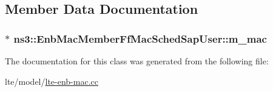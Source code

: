 \subsection{Member Data Documentation}
\subsubsection[{\texorpdfstring{m\+\_\+mac}{m_mac}}]{$\ast$ ns3\+::\+Enb\+Mac\+Member\+Ff\+Mac\+Sched\+Sap\+User\+::m\+\_\+mac\hspace{0.3cm}{\ttfamily [private]}}\hypertarget{classns3_1_1EnbMacMemberFfMacSchedSapUser_a723e1207d4f44be8a723054a722dd6a1}{}\label{classns3_1_1EnbMacMemberFfMacSchedSapUser_a723e1207d4f44be8a723054a722dd6a1}


The documentation for this class was generated from the following file\+:\begin{DoxyCompactItemize}
\item 
lte/model/\hyperlink{lte-enb-mac_8cc}{lte-\/enb-\/mac.\+cc}\end{DoxyCompactItemize}
